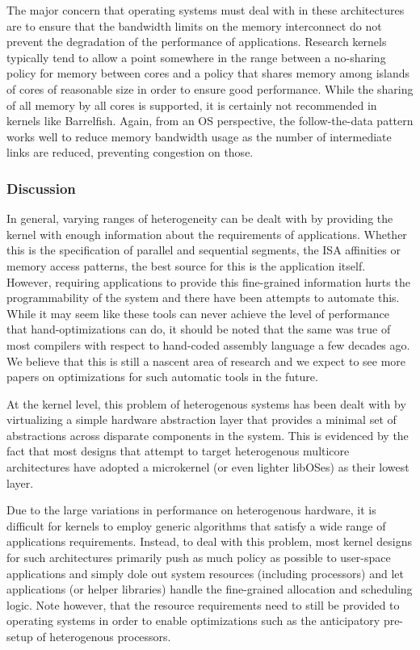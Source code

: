 The major concern that operating systems must deal with in these architectures are to ensure that the bandwidth limits on the memory interconnect do not prevent the degradation of the performance of applications. Research kernels typically tend to allow a point somewhere in the range between a no-sharing policy for memory between cores and a policy that shares memory among islands of cores of reasonable size in order to ensure good performance. While the sharing of all memory by all cores is supported, it is certainly not recommended in kernels like Barrelfish. Again, from an OS perspective, the follow-the-data pattern works well to reduce memory bandwidth usage as the number of intermediate links are reduced, preventing congestion on those.

\subsubsection{Discussion}

In general, varying ranges of heterogeneity can be dealt with by providing the kernel with enough information about the requirements of applications. Whether this is the specification of parallel and sequential segments, the ISA affinities or memory access patterns, the best source for this is the application itself. However, requiring applications to provide this fine-grained information hurts the programmability of the system and there have been attempts to automate this. While it may seem like these tools can never achieve the level of performance that hand-optimizations can do, it should be noted that the same was true of most compilers with respect to hand-coded assembly language a few decades ago. We believe that this is still a nascent area of research and we expect to see more papers on optimizations for such automatic tools in the future.

At the kernel level, this problem of heterogenous systems has been dealt with by virtualizing a simple hardware abstraction layer that provides a minimal set of abstractions across disparate components in the system. This is evidenced by the fact that most designs that attempt to target heterogenous multicore architectures have adopted a microkernel (or even lighter libOSes) as their lowest layer.

Due to the large variations in performance on heterogenous hardware, it is difficult for kernels to employ generic algorithms that satisfy a wide range of applications requirements. Instead, to deal with this problem, most kernel designs for such architectures primarily push as much policy as possible to user-space applications and simply dole out system resources (including processors) and let applications (or helper libraries) handle the fine-grained allocation and scheduling logic. Note however, that the resource requirements need to still be provided to operating systems in order to enable optimizations such as the anticipatory pre-setup of heterogenous processors.

